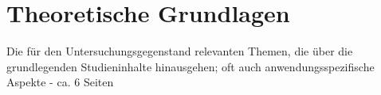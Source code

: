 \chapter{Theoretische Grundlagen}
\thispagestyle{fancy}

Die für den Untersuchungsgegenstand relevanten Themen, die über die grundlegenden Studieninhalte hinausgehen; oft auch anwendungsspezifische Aspekte - ca. 6 Seiten